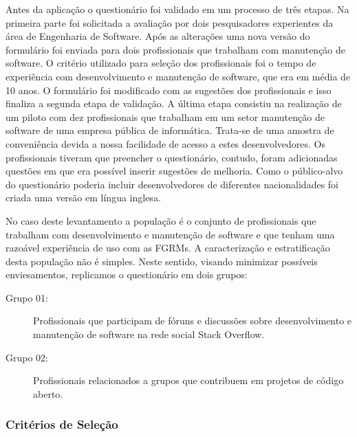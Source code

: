Antes da aplicação o questionário foi validado em um processo de três etapas. Na
primeira parte foi solicitada a avaliação por dois pesquisadores experientes da
área de Engenharia de Software. Após as alterações uma nova versão do formulário
foi enviada para dois profissionais que trabalham com manutenção de software. O
critério utilizado para seleção dos profissionais foi o tempo de experiência com
desenvolvimento e manutenção de software, que era em média de 10 anos. O
formulário foi modificado com as sugestões dos profissionais e isso finaliza a
segunda etapa de validação. A última etapa consistiu na realização de um piloto
com dez profissionais que trabalham em um setor manutenção de software de uma
empresa pública de informática. Trata-se de uma amostra de conveniência devida a
nossa facilidade de acesso a estes desenvolvedores. Os profissionais tiveram
que preencher o questionário, contudo, foram adicionadas questões em que era
possível inserir sugestões de melhoria. Como o público-alvo do questionário
poderia incluir desenvolvedores de diferentes nacionalidades foi criada uma
versão em língua inglesa.

No caso deste levantamento a população é o conjunto de profissionais que
trabalham com desenvolvimento e manutenção de software e que tenham uma razoável
experiência de uso com as FGRMs. A caracterização e estratificação desta
população não é simples. Neste sentido, visando minimizar possíveis
enviesamentos, replicamos o questionário em dois grupos:

\begin{description}
	\item[Grupo 01:] Profissionais que participam de fóruns e discussões sobre
		desenvolvimento e manutenção de software na rede social Stack Overflow.
	\item[Grupo 02:] Profissionais relacionados a grupos que contribuem em
		projetos de código aberto.
\end{description}


\subsubsection{Critérios de Seleção}
\label{ssub:metodologia_criterios_selecao}

